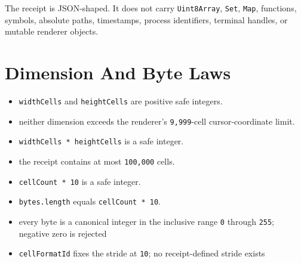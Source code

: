 The receipt is JSON-shaped. It does not carry \texttt{U\allowbreak{}i\allowbreak{}n\allowbreak{}t\allowbreak{}8\allowbreak{}A\allowbreak{}r\allowbreak{}r\allowbreak{}a\allowbreak{}y}, \texttt{S\allowbreak{}e\allowbreak{}t}, \texttt{M\allowbreak{}a\allowbreak{}p}, functions, symbols, absolute paths, timestamps, process identifiers, terminal handles, or mutable renderer objects.

\section{Dimension And Byte Laws}\label{record-164-dimension-and-byte-laws}

\begin{itemize}
\tightlist
\item
  \texttt{w\allowbreak{}i\allowbreak{}d\allowbreak{}t\allowbreak{}h\allowbreak{}C\allowbreak{}e\allowbreak{}l\allowbreak{}l\allowbreak{}s} and \texttt{h\allowbreak{}e\allowbreak{}i\allowbreak{}g\allowbreak{}h\allowbreak{}t\allowbreak{}C\allowbreak{}e\allowbreak{}l\allowbreak{}l\allowbreak{}s} are positive safe integers.
\item
  neither dimension exceeds the renderer's \texttt{9\allowbreak{},\allowbreak{}9\allowbreak{}9\allowbreak{}9}-cell cursor-coordinate limit.
\item
  \texttt{w\allowbreak{}i\allowbreak{}d\allowbreak{}t\allowbreak{}h\allowbreak{}C\allowbreak{}e\allowbreak{}l\allowbreak{}l\allowbreak{}s\allowbreak{} \allowbreak{}*\allowbreak{} \allowbreak{}h\allowbreak{}e\allowbreak{}i\allowbreak{}g\allowbreak{}h\allowbreak{}t\allowbreak{}C\allowbreak{}e\allowbreak{}l\allowbreak{}l\allowbreak{}s} is a safe integer.
\item
  the receipt contains at most \texttt{1\allowbreak{}0\allowbreak{}0\allowbreak{},\allowbreak{}0\allowbreak{}0\allowbreak{}0} cells.
\item
  \texttt{c\allowbreak{}e\allowbreak{}l\allowbreak{}l\allowbreak{}C\allowbreak{}o\allowbreak{}u\allowbreak{}n\allowbreak{}t\allowbreak{} \allowbreak{}*\allowbreak{} \allowbreak{}1\allowbreak{}0} is a safe integer.
\item
  \texttt{b\allowbreak{}y\allowbreak{}t\allowbreak{}e\allowbreak{}s\allowbreak{}.\allowbreak{}l\allowbreak{}e\allowbreak{}n\allowbreak{}g\allowbreak{}t\allowbreak{}h} equals \texttt{c\allowbreak{}e\allowbreak{}l\allowbreak{}l\allowbreak{}C\allowbreak{}o\allowbreak{}u\allowbreak{}n\allowbreak{}t\allowbreak{} \allowbreak{}*\allowbreak{} \allowbreak{}1\allowbreak{}0}.
\item
  every byte is a canonical integer in the inclusive range \texttt{0} through \texttt{2\allowbreak{}5\allowbreak{}5}; negative zero is rejected
\item
  \texttt{c\allowbreak{}e\allowbreak{}l\allowbreak{}l\allowbreak{}F\allowbreak{}o\allowbreak{}r\allowbreak{}m\allowbreak{}a\allowbreak{}t\allowbreak{}I\allowbreak{}d} fixes the stride at \texttt{1\allowbreak{}0}; no receipt-defined stride exists
\end{itemize}


